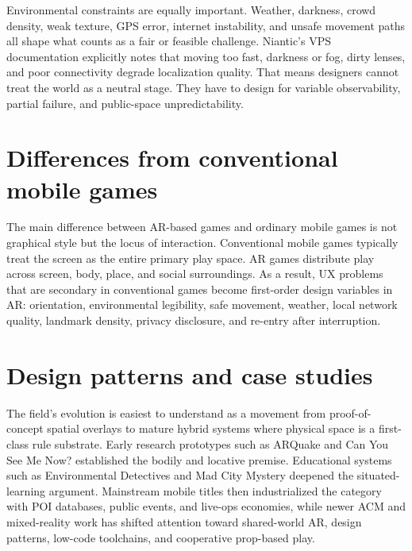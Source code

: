 \begin{sloppy}
Environmental constraints are equally important. Weather, darkness, crowd density, weak texture, GPS error, internet instability, and unsafe movement paths all shape what counts as a fair or feasible challenge. Niantic's VPS documentation explicitly notes that moving too fast, darkness or fog, dirty lenses, and poor connectivity degrade localization quality. That means designers cannot treat the world as a neutral stage. They have to design for variable observability, partial failure, and public-space unpredictability.

\section*{Differences from conventional mobile games}
The main difference between AR-based games and ordinary mobile games is not graphical style but the locus of interaction. Conventional mobile games typically treat the screen as the entire primary play space. AR games distribute play across screen, body, place, and social surroundings. As a result, UX problems that are secondary in conventional games become first-order design variables in AR: orientation, environmental legibility, safe movement, weather, local network quality, landmark density, privacy disclosure, and re-entry after interruption.

\section*{Design patterns and case studies}
The field's evolution is easiest to understand as a movement from proof-of-concept spatial overlays to mature hybrid systems where physical space is a first-class rule substrate. Early research prototypes such as ARQuake and Can You See Me Now? established the bodily and locative premise. Educational systems such as Environmental Detectives and Mad City Mystery deepened the situated-learning argument. Mainstream mobile titles then industrialized the category with POI databases, public events, and live-ops economies, while newer ACM and mixed-reality work has shifted attention toward shared-world AR, design patterns, low-code toolchains, and cooperative prop-based play.

\end{sloppy}

